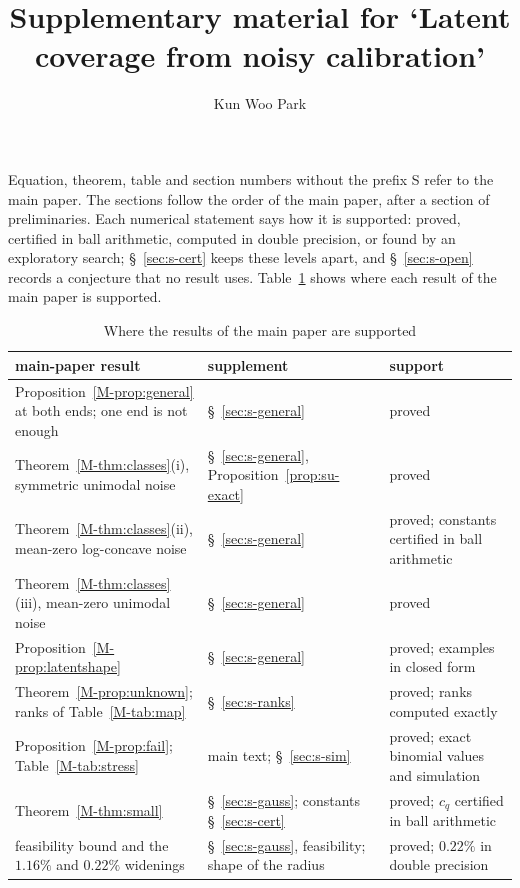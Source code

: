 \documentclass[11pt]{article}
\title{Supplementary material for `Latent coverage from noisy calibration'}
\author{Kun Woo Park}
\date{}
\renewcommand{\_}{\usc\allowbreak}
\begin{document}
\maketitle

\noindent Equation, theorem, table and section numbers without the prefix S refer to the main paper. The sections follow the order of the main paper, after a section of preliminaries. Each numerical statement says how it is supported: proved, certified in ball arithmetic, computed in double precision, or found by an exploratory search; \S~\ref{sec:s-cert} keeps these levels apart, and \S~\ref{sec:s-open} records a conjecture that no result uses. Table~\ref{tab:s-roadmap} shows where each result of the main paper is supported.

\begin{table}[h]
\centering
\caption{Where the results of the main paper are supported}
\label{tab:s-roadmap}
\footnotesize
\begin{tabular}{>{\raggedright\arraybackslash}p{}>{\raggedright\arraybackslash}p{}>{\raggedright\arraybackslash}p{}}
\toprule
main-paper result & supplement & support \\
\midrule
Proposition~\ref{M-prop:general} at both ends; one end is not enough & \S~\ref{sec:s-general} & proved \\
Theorem~\ref{M-thm:classes}(i), symmetric unimodal noise & \S~\ref{sec:s-general}, Proposition~\ref{prop:su-exact} & proved \\
Theorem~\ref{M-thm:classes}(ii), mean-zero log-concave noise & \S~\ref{sec:s-general} & proved; constants certified in ball arithmetic \\
Theorem~\ref{M-thm:classes}(iii), mean-zero unimodal noise & \S~\ref{sec:s-general} & proved \\
Proposition~\ref{M-prop:latentshape} & \S~\ref{sec:s-general} & proved; examples in closed form \\
Theorem~\ref{M-prop:unknown}; ranks of Table~\ref{M-tab:map} & \S~\ref{sec:s-ranks} & proved; ranks computed exactly \\
Proposition~\ref{M-prop:fail}; Table~\ref{M-tab:stress} & main text; \S~\ref{sec:s-sim} & proved; exact binomial values and simulation \\
Theorem~\ref{M-thm:small} & \S~\ref{sec:s-gauss}; constants \S~\ref{sec:s-cert} & proved; $c_q$ certified in ball arithmetic \\
feasibility bound and the $1.16\%$ and $0.22\%$ widenings & \S~\ref{sec:s-gauss}, feasibility; shape of the radius & proved; $0.22\%$ in double precision \\

\end{tabular}
\end{table}
\end{document}
